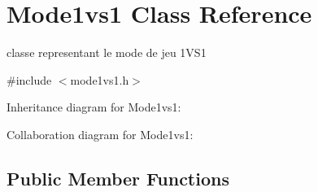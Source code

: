 \hypertarget{class_mode1vs1}{}\section{Mode1vs1 Class Reference}
\label{class_mode1vs1}


classe representant le mode de jeu 1\+V\+S1  




{\ttfamily \#include $<$mode1vs1.\+h$>$}



Inheritance diagram for Mode1vs1\+:


Collaboration diagram for Mode1vs1\+:
\subsection*{Public Member Functions}
